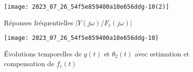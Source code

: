 \begin{figure}[!h]
\centering
\texttt{[image: 2023\_07\_26\_54f5e859400a10e656ddg-10(2)]}
\caption{\label{fig_ccspsi2022:17}Réponses fréquentielles $\left|Y(j \omega) / F_{c}(j \omega)\right|$}
\end{figure}


\begin{figure}[!h]
\centering
\texttt{[image: 2023\_07\_26\_54f5e859400a10e656ddg-10]}
\caption{\label{fig_ccspsi2022:18}Évolutions temporelles de $y(t)$ et $\theta_{2}(t)$ avec estimation et compensation de $f_{c}(t)$}
\end{figure}

%